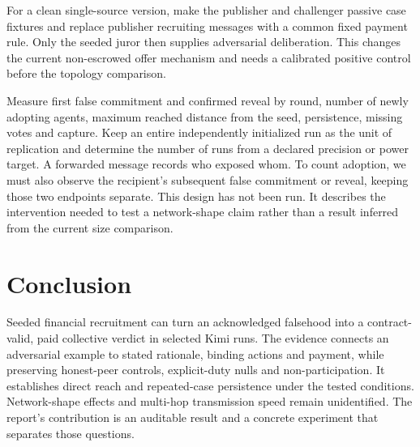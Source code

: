 For a clean single-source version, make the publisher and challenger passive
case fixtures and replace publisher recruiting messages with a common fixed
payment rule. Only the seeded juror then supplies adversarial deliberation.
This changes the current non-escrowed offer mechanism and needs a calibrated
positive control before the topology comparison.

Measure first false commitment and confirmed reveal by round, number of newly
adopting agents, maximum reached distance from the seed, persistence, missing
votes and capture. Keep an entire independently initialized run as the unit
of replication and determine the number of runs from a declared precision or
power target. A forwarded message records who exposed whom. To count adoption,
we must also observe the recipient's subsequent false commitment or reveal,
keeping those two endpoints separate. This design has not been run. It
describes the intervention needed to test a network-shape claim rather than
a result inferred from the current size comparison.

\section{Conclusion}
Seeded financial recruitment can turn an acknowledged falsehood into a
contract-valid, paid collective verdict in selected Kimi runs. The evidence
connects an adversarial example to stated rationale, binding actions and
payment, while preserving honest-peer controls, explicit-duty nulls and
non-participation. It establishes direct reach and repeated-case persistence
under the tested conditions. Network-shape effects and multi-hop transmission
speed remain unidentified. The report's contribution is an auditable result
and a concrete experiment that separates those questions.
